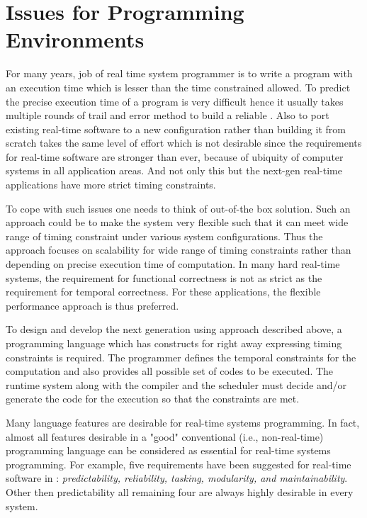 \section{Issues for Programming Environments}\label{section:issues-in-programming-environment}
For many years, job of real time system programmer is to write a program with an execution time which is lesser than the time constrained allowed. To predict the precise execution time of a program is very difficult hence it usually takes multiple rounds of trail and error method to build a reliable \rts. Also to port existing real-time software to a new configuration rather than building it from scratch takes the same level of effort which is not desirable since the requirements for real-time software are stronger than ever, because of ubiquity of computer systems in all application areas. And not only this but the next-gen real-time applications have more strict timing constraints.

To cope with such issues one needs to think of out-of-the box solution. Such an approach could be to make the system very flexible such that it can meet wide range of timing constraint under various system configurations. Thus the approach focuses on scalability for wide range of timing constraints rather than depending on precise execution time of computation.
In many hard real-time systems, the requirement for functional correctness is not as strict as the requirement for temporal correctness. For these applications, the flexible performance approach is thus preferred\cite{Lin1995}.

To design and develop the next generation \rtsS using approach described above, a programming language which has constructs for right away expressing timing constraints is required. The programmer defines the temporal constraints for the computation and also provides all possible set of codes to be executed. The runtime system along with the compiler and the scheduler must decide and/or generate the code for the execution so that the constraints are met.

Many language features are desirable for real-time systems programming. In fact, almost all features desirable in a "good" conventional (i.e., non-real-time) programming language can be considered as essential for real-time systems programming. For example, five requirements\label{rts-requirements} have been suggested for real-time software in \cite{Stoyenko1993}: \textit{predictability, reliability, tasking, modularity, and maintainability}. Other then predictability all remaining four are always highly desirable in every system. 

